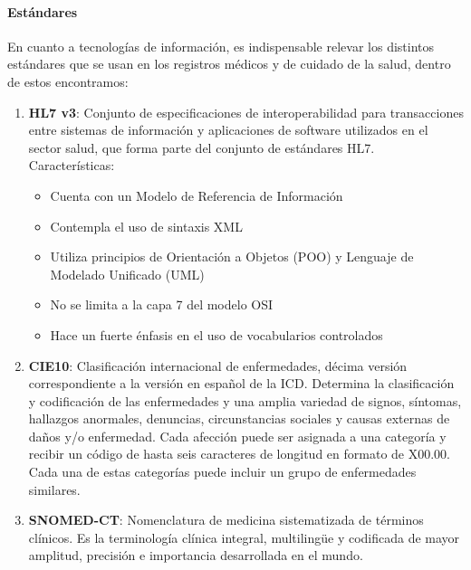 \paragraph{Estándares}


En cuanto a tecnologías de información, es indispensable relevar los distintos estándares que se usan en los registros médicos y de cuidado de la salud, dentro de estos encontramos:

\begin{enumerate}
	\item\textbf{HL7 v3}: Conjunto de especificaciones de interoperabilidad para transacciones entre sistemas de información y aplicaciones de software utilizados en el sector salud, que forma parte del conjunto de estándares HL7. Características:
    	\begin{itemize}
			\item Cuenta con un Modelo de Referencia de Información
            \item Contempla el uso de sintaxis XML
            \item Utiliza principios de Orientación a Objetos (POO) y Lenguaje de Modelado Unificado (UML)
            \item No se limita a la capa 7 del modelo OSI
            \item Hace un fuerte énfasis en el uso de vocabularios controlados
		\end{itemize}
    
    \item\textbf{CIE10}: Clasificación internacional de enfermedades, décima versión correspondiente a la versión en español de la ICD. Determina la clasificación y codificación de las enfermedades y una amplia variedad de signos, síntomas, hallazgos anormales, denuncias, circunstancias sociales y causas externas de daños y/o enfermedad. Cada afección puede ser asignada a una categoría y recibir un código de hasta seis caracteres de longitud en formato de X00.00. Cada una de estas categorías puede incluir un grupo de enfermedades similares.
    
    \item\textbf{SNOMED-CT}: Nomenclatura de medicina sistematizada de términos clínicos. Es la terminología clínica integral, multiling\"{u}e y codificada de mayor amplitud, precisión e importancia desarrollada en el mundo.
    

\end{enumerate}
